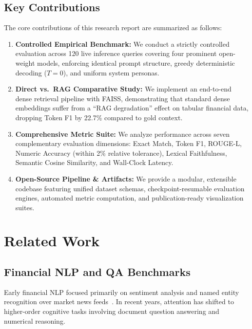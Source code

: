 \documentclass[11pt]{article}
\begin{document}
\subsection{Key Contributions}
The core contributions of this research report are summarized as follows:
\begin{enumerate}
    \item \textbf{Controlled Empirical Benchmark:} We conduct a strictly controlled evaluation across 120 live inference queries covering four prominent open-weight models, enforcing identical prompt structure, greedy deterministic decoding ($T=0$), and uniform system personas.
    \item \textbf{Direct vs.\ RAG Comparative Study:} We implement an end-to-end dense retrieval pipeline with FAISS, demonstrating that standard dense embeddings suffer from a ``RAG degradation'' effect on tabular financial data, dropping Token F1 by 22.7\% compared to gold context.
    \item \textbf{Comprehensive Metric Suite:} We analyze performance across seven complementary evaluation dimensions: Exact Match, Token F1, ROUGE-L, Numeric Accuracy (within 2\% relative tolerance), Lexical Faithfulness, Semantic Cosine Similarity, and Wall-Clock Latency.
    \item \textbf{Open-Source Pipeline & Artifacts:} We provide a modular, extensible codebase featuring unified dataset schemas, checkpoint-resumable evaluation engines, automated metric computation, and publication-ready visualization suites.
\end{enumerate}

\section{Related Work}
\label{sec:related_work}

\subsection{Financial NLP and QA Benchmarks}
Early financial NLP focused primarily on sentiment analysis and named entity recognition over market news feeds~\citep{shah2022flue}. In recent years, attention has shifted to higher-order cognitive tasks involving document question answering and numerical reasoning. 
\end{document}
